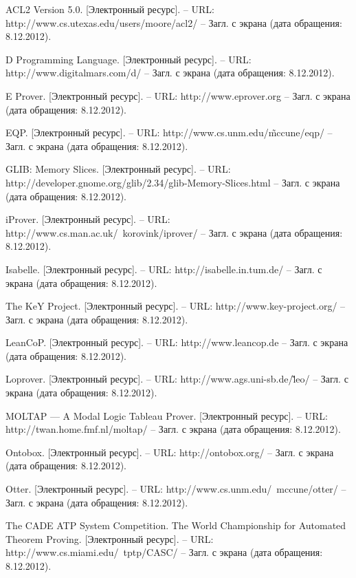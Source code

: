 \begin{thebibliography}{99}

 ACL2 Version 5.0. [Электронный ресурс]. -- URL: http://www.cs.utexas.edu/users/moore/acl2/ -- Загл. с экрана (дата обращения: 8.12.2012).

 D Programming Language. [Электронный ресурс]. -- URL: http://www.digitalmars.com/d/ -- Загл. с экрана (дата обращения: 8.12.2012).

 E Prover. [Электронный ресурс]. -- URL: http://www.eprover.org -- Загл. с экрана (дата обращения: 8.12.2012).

 EQP. [Электронный ресурс]. -- URL: http://www.cs.unm.edu/\~mccune/eqp/ -- Загл. с экрана (дата обращения: 8.12.2012).

 GLIB: Memory Slices. [Электронный ресурс]. -- URL: http://developer.gnome.org/glib/2.34/glib-Memory-Slices.html -- Загл. с экрана (дата обращения: 8.12.2012).

 iProver. [Электронный ресурс]. -- URL: http://www.cs.man.ac.uk/~korovink/iprover/ -- Загл. с экрана (дата обращения: 8.12.2012).

 Isabelle. [Электронный ресурс]. -- URL: http://isabelle.in.tum.de/ -- Загл. с экрана (дата обращения: 8.12.2012).

 The KeY Project. [Электронный ресурс]. -- URL: http://www.key-project.org/ -- Загл. с экрана (дата обращения: 8.12.2012).

 LeanCoP. [Электронный ресурс]. -- URL: http://www.leancop.de -- Загл. с экрана (дата обращения: 8.12.2012).

 Loprover. [Электронный ресурс]. -- URL: http://www.ags.uni-sb.de/\~leo/ -- Загл. с экрана (дата обращения: 8.12.2012).

 MOLTAP — A Modal Logic Tableau Prover. [Электронный ресурс]. -- URL: http://twan.home.fmf.nl/moltap/ -- Загл. с экрана (дата обращения: 8.12.2012).

 Ontobox. [Электронный ресурс]. -- URL: http://ontobox.org/ -- Загл. с экрана (дата обращения: 8.12.2012).

 Otter. [Электронный ресурс]. -- URL: http://www.cs.unm.edu/~mccune/ot\-ter/ -- Загл. с экрана (дата обращения: 8.12.2012).

 The CADE ATP System Competition. The World Championship for Automated Theorem Proving. [Электронный ресурс]. -- URL: http://www.cs.miami.edu/~tptp/CASC/ -- Загл. с экрана (дата обращения: 8.12.2012).


\end{thebibliography}
